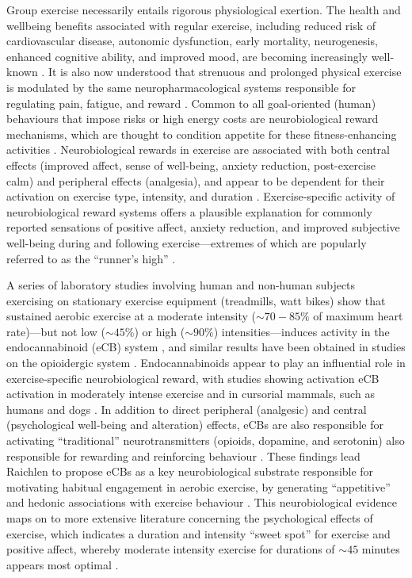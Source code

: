 \begin{CJK}{UTF8}{gbsn}
Group exercise necessarily entails rigorous physiological exertion.
The health and wellbeing benefits associated with regular exercise, including reduced risk of cardiovascular disease, autonomic dysfunction, early mortality, neurogenesis, enhanced cognitive ability, and improved mood, are becoming increasingly well-known \citep{Blair1994,Nagamatsu2014}.  It is also now understood that strenuous and prolonged physical exercise is modulated by the same neuropharmacological systems responsible for regulating pain, fatigue, and reward \citep{Boecker2008,Raichlen2013}.  Common to all goal-oriented (human) behaviours that impose risks or high energy costs are neurobiological reward mechanisms, which are thought to condition appetite for these fitness-enhancing activities \citep{Burgdorf2006}.  Neurobiological rewards in exercise are associated with both central effects (improved affect, sense of well-being, anxiety reduction, post-exercise calm) and peripheral effects (analgesia), and appear to be dependent for their activation on exercise type, intensity, and duration \citep{Dietrich2004}.  Exercise-specific activity of neurobiological reward systems offers a plausible explanation for commonly reported sensations of positive affect, anxiety reduction, and improved subjective well-being during and following exercise---extremes of which are popularly referred to as the ``runner's high'' \citep{(Dietrich2004,Boecker2008,Raichlen2012}.

A series of laboratory studies involving human and non-human subjects exercising on stationary exercise equipment (treadmills, watt bikes) show that sustained aerobic exercise at a moderate intensity ($\sim70-85\%$ of maximum heart rate)---but not low ($\sim45\%$) or high ($\sim90\%$) intensities---induces activity in the endocannabinoid (eCB) system \citep{Raichlen2013}, and similar results have been obtained in studies on the opioidergic system \citep{Boecker2008}.  Endocannabinoids appear to play an influential role in exercise-specific neurobiological reward, with studies showing activation eCB activation in moderately intense exercise and in cursorial mammals, such as humans and dogs \citep[but not non-cursorial mammals, e.g., ferrets;][]{Raichlen2012}.  In addition to direct peripheral (analgesic) and central (psychological well-being and alteration) effects, eCBs are also responsible for activating ``traditional'' neurotransmitters (opioids, dopamine, and serotonin) also responsible for rewarding and reinforcing behaviour \citep{Sparling2003}.  These findings lead Raichlen to propose eCBs as a key neurobiological substrate responsible for motivating habitual engagement in aerobic exercise, by generating ``appetitive'' and hedonic associations with exercise behaviour \citep{Raichlen2012}.  This neurobiological evidence maps on to more extensive literature concerning the psychological effects of exercise, which indicates a duration and intensity ``sweet spot'' for exercise and positive affect, whereby moderate intensity exercise for durations of $\sim45$ minutes appears most optimal \citep{Reed2006}.


\end{CJK}

